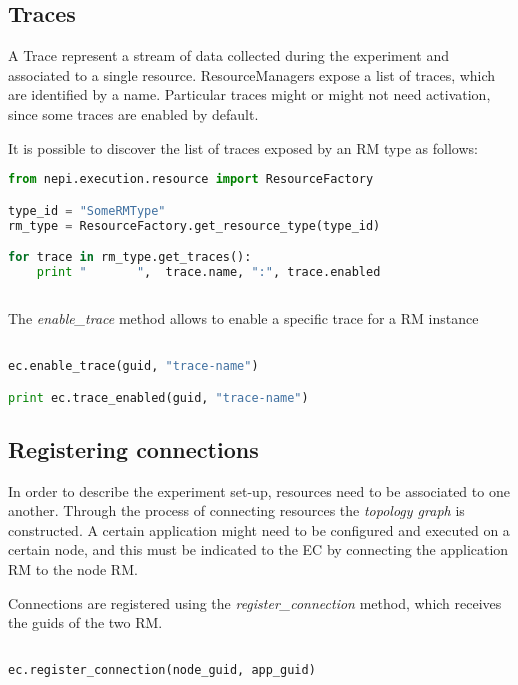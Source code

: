\subsection{Traces}

A Trace represent a stream of data collected during the experiment and associated
to a single resource. ResourceManagers expose a list of traces, which are identified
by a name. Particular traces might or might not need activation, since some traces
are enabled by default.

It is possible to discover the list of traces exposed by an 
RM type as follows:

\begin{lstlisting}[language=Python]
from nepi.execution.resource import ResourceFactory

type_id = "SomeRMType"
rm_type = ResourceFactory.get_resource_type(type_id)

for trace in rm_type.get_traces():
    print "       ",  trace.name, ":", trace.enabled
    
\end{lstlisting}

The \emph{enable\_trace} method allows to enable a specific trace for a 
RM instance

\begin{lstlisting}[language=Python]

ec.enable_trace(guid, "trace-name")

print ec.trace_enabled(guid, "trace-name")

\end{lstlisting}

\subsection{Registering connections}

In order to describe the experiment set-up, resources need to be 
associated to one another. Through the process of connecting resources
the \emph{topology graph} is constructed. A certain application might
need to be configured and executed on a certain node, and this
must be indicated to the EC by connecting the application RM to the node
RM.

Connections are registered using the \emph{register\_connection} method,
which receives the guids of the two RM.

\begin{lstlisting}[language=Python]

ec.register_connection(node_guid, app_guid)

\end{lstlisting}

